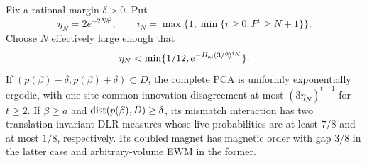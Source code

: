 \begin{lemma}\label{lem:finite-counter}
Fix a rational margin \(\delta>0\). Put
\[
\eta_N=2e^{-2N\delta^2},\qquad
i_N=\max\{1,\min\{i\ge0:P^i\ge N+1\}\}.
\]
Choose \(N\) effectively large enough that
\begin{equation}\label{eq:counter-size}
\eta_N<\min\{1/12,e^{-H_{\rm al}(3/2)^{i_N}}\}.
\end{equation}
If \((p(\beta)-\delta,p(\beta)+\delta)\subset D\), the complete PCA is uniformly exponentially ergodic, with one-site common-innovation disagreement at most \((3\eta_N)^{t-1}\) for \(t\ge2\). If \(\beta\ge a\) and \(\operatorname{dist}(p(\beta),D)\ge\delta\), its mismatch interaction has two translation-invariant DLR measures whose live probabilities are at least \(7/8\) and at most \(1/8\), respectively. Its doubled magnet has magnetic order with gap \(3/8\) in the latter case and arbitrary-volume EWM in the former.
\end{lemma}

